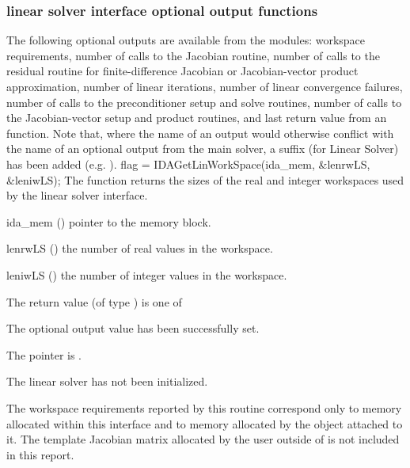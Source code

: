 {%
\subsubsection{{\idals} linear solver interface optional output functions}
\label{sss:optout_ls}
The following optional outputs are available from the {\idals} modules:
workspace requirements,
number of calls to the Jacobian routine,
number of calls to the residual routine for finite-difference Jacobian or Jacobian-vector product approximation,
number of linear iterations,
number of linear convergence failures,
number of calls to the preconditioner setup and solve routines,
number of calls to the Jacobian-vector setup and product routines,
and last return value from an {\idals} function.
Note that, where the name of an output would otherwise conflict with
the name of an optional output from the main solver, a suffix 
(for Linear Solver) has been added (e.g. ).
{
  flag = IDAGetLinWorkSpace(ida\_mem, \&lenrwLS, \&leniwLS);
}
{
  The function  returns the sizes of the real and
  integer workspaces used by the {\idals} linear solver interface.
}
{
  \begin{args}
  \item[ida\_mem] ()
    pointer to the {\ida} memory block.
  \item[lenrwLS] ()
    the number of real values in the {\idals} workspace.
  \item[leniwLS] ()
    the number of integer values in the {\idals} workspace.
  \end{args}
}
{
  The return value  (of type ) is one of
  \begin{args}
  \item[\Id{IDALS\_SUCCESS}]
    The optional output value has been successfully set.
  \item[\Id{IDALS\_MEM\_NULL}]
    The  pointer is .
  \item[\Id{IDALS\_LMEM\_NULL}]
    The {\idals} linear solver has not been initialized.
  \end{args}
}
{
  The workspace requirements reported by this routine correspond only
  to memory allocated within this interface and to memory allocated by
  the {\sunlinsol} object attached to it.  The template Jacobian
  matrix allocated by the user outside of {\idals} is not included in
  this report.

}}
